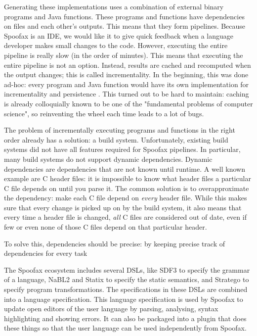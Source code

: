 Generating these implementations uses a combination of external binary programs and Java functions.
These programs and functions have dependencies on files and each other's outputs.
This means that they form pipelines.
Because Spoofax is an IDE, we would like it to give quick feedback when a language developer makes small changes to the code.
However, executing the entire pipeline is really slow (in the order of minutes).
This means that executing the entire pipeline is not an option.
Instead, results are cached and recomputed when the output changes; this is called incrementality.
In the beginning, this was done ad-hoc: every program and Java function would have its own implementation for incrementality and persistence .
This turned out to be hard to maintain: caching is already colloquially known to be one of the "fundamental problems of computer science", so reinventing the wheel each time leads to a lot of bugs.

The problem of incrementally executing programs and functions in the right order already has a solution: a build system.
Unfortunately, existing build systems did not have all features required for Spoofax pipelines.
In particular, many build systems do not support dynamic dependencies.
Dynamic dependencies are dependencies that are not known until runtime.
A well known example are C header files: it is impossible to know what header files a particular C file depends on until you parse it.
The common solution is to overapproximate the dependency: make each C file depend on \emph{every} header file.
While this makes sure that every change is picked up on by the build system, it also means that every time a header file is changed, \emph{all} C files are considered out of date, even if few or even none of those C files depend on that particular header.

To solve this, dependencies should be precise: by keeping precise track of dependencies for every task





The Spoofax ecosystem includes several DSLs, like SDF3 to specify the grammar of a language, NaBL2 and Statix to specify the static semantics, and Stratego to specify program transformations. 
The specifications in these DSLs are combined into a language specification.
This language specification is used by Spoofax to update open editors of the user language by parsing, analysing, syntax highlighting and showing errors.
It can also be packaged into a plugin that does these things so that the user language can be used independently from Spoofax.

